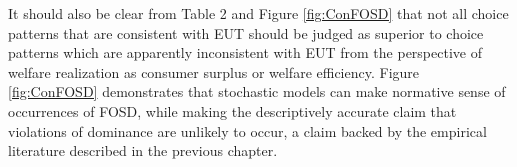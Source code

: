 \documentclass[../main.tex]{subfiles}
\begin{document}
It should also be clear from Table 2 and Figure \ref{fig:ConFOSD} that not all choice patterns that are consistent with EUT should be judged as superior to choice patterns which are apparently inconsistent with EUT from the perspective of welfare realization as consumer surplus or welfare efficiency.
Figure \ref{fig:ConFOSD} demonstrates that stochastic models can make normative sense of occurrences of FOSD, while making the descriptively accurate claim that violations of dominance are unlikely to occur, a claim backed by the empirical literature described in the previous chapter.

%
%
\end{document}
